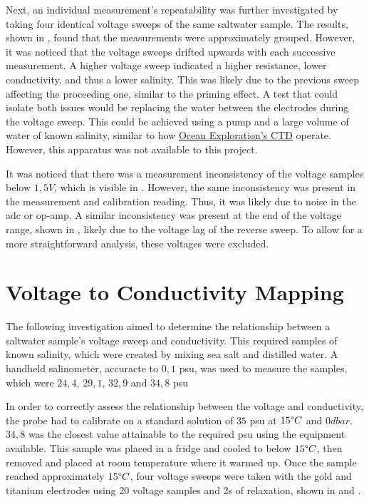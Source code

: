Next, an individual measurement's repeatability was further investigated by taking four identical voltage sweeps of the same saltwater sample.
The results, shown in , found that the measurements were approximately grouped.
However, it was noticed that the voltage sweeps drifted upwards with each successive measurement.
A higher voltage sweep indicated a higher resistance, lower conductivity, and thus a lower salinity.
This was likely due to the previous sweep affecting the proceeding one, similar to the priming effect.
A test that could isolate both issues would be replacing the water between the electrodes during the voltage sweep.
This could be achieved using a pump and a large volume of water of known salinity, similar to how \href{https://oceanexplorer.noaa.gov/technology/ctd/ctd.html}{Ocean Exploration's CTD} operate. 
However, this apparatus was not available to this project.

It was noticed that there was a measurement inconsistency of the voltage samples below $1,5V$, which is visible in .
However, the same inconsistency was present in the measurement and calibration reading. 
Thus, it was likely due to noise in the \gls{adc} or op-amp.
A similar inconsistency was present at the end of the voltage range, shown in , likely due to the voltage lag of the reverse sweep.
To allow for a more straightforward analysis, these voltages were excluded.

\section{Voltage to Conductivity Mapping}\label{sec:voltage-conductivity-mapping}

The following investigation aimed to determine the relationship between a saltwater sample's voltage sweep and conductivity.
This required samples of known salinity, which were created by mixing sea salt and distilled water.
A handheld salinometer, accuracte to $0,1$ \gls{psu}, was used to measure the samples, which were $24,4$, $29,1$, $32,9$ and $34,8$ \gls{psu}

In order to correctly assess the relationship between the voltage and conductivity, the probe had to calibrate on a standard solution of $35$ \gls{psu} at $15\degree C$ and $0dbar$.
$34,8$ was the closest value attainable to the required \gls{psu} using the equipment available.
This sample was placed in a fridge and cooled to below $15\degree C$, then removed and placed at room temperature where it warmed up. 
Once the sample reached approximately $15\degree C$, four voltage sweeps were taken with the gold and titanium electrodes using 20 voltage samples and 2s of relaxation, shown in  and .


